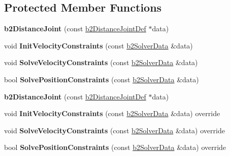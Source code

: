 \subsection*{Protected Member Functions}
\begin{DoxyCompactItemize}
\item 
\mbox{\label{classb2DistanceJoint_ad2bb6de92a47868629a7397e23256454}} 
{\bfseries b2\+Distance\+Joint} (const \hyperlink{structb2DistanceJointDef}{b2\+Distance\+Joint\+Def} $\ast$data)
\item 
\mbox{\label{classb2DistanceJoint_a2062ea8f1c89f8ccc3f053bbc7211b12}} 
void {\bfseries Init\+Velocity\+Constraints} (const \hyperlink{structb2SolverData}{b2\+Solver\+Data} \&data)
\item 
\mbox{\label{classb2DistanceJoint_acbed5cd22ea4ccb44e4defe5f5aabe77}} 
void {\bfseries Solve\+Velocity\+Constraints} (const \hyperlink{structb2SolverData}{b2\+Solver\+Data} \&data)
\item 
\mbox{\label{classb2DistanceJoint_a1e8b3a477067cf9273fb78fbec1a1556}} 
bool {\bfseries Solve\+Position\+Constraints} (const \hyperlink{structb2SolverData}{b2\+Solver\+Data} \&data)
\item 
\mbox{\label{classb2DistanceJoint_ad2bb6de92a47868629a7397e23256454}} 
{\bfseries b2\+Distance\+Joint} (const \hyperlink{structb2DistanceJointDef}{b2\+Distance\+Joint\+Def} $\ast$data)
\item 
\mbox{\label{classb2DistanceJoint_abe956dd5951651b36321098416ad99fd}} 
void {\bfseries Init\+Velocity\+Constraints} (const \hyperlink{structb2SolverData}{b2\+Solver\+Data} \&data) override
\item 
\mbox{\label{classb2DistanceJoint_ad42429151fb979a230f103d684d2a42c}} 
void {\bfseries Solve\+Velocity\+Constraints} (const \hyperlink{structb2SolverData}{b2\+Solver\+Data} \&data) override
\item 
\mbox{\label{classb2DistanceJoint_a431d12fac5ee9f6a5637321ee28119bc}} 
bool {\bfseries Solve\+Position\+Constraints} (const \hyperlink{structb2SolverData}{b2\+Solver\+Data} \&data) override
\end{DoxyCompactItemize}
